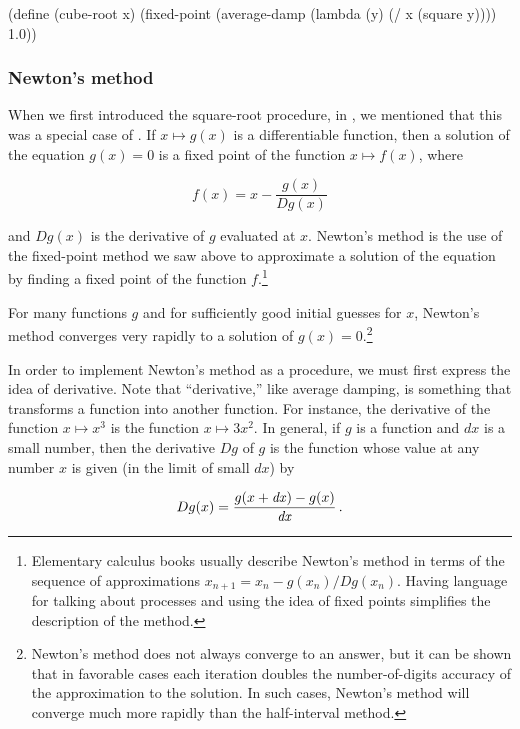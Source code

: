 \begin{codeBlock}
(define (cube-root x)
  (fixed-point (average-damp (lambda (y) (/ x (square y))))
               1.0))
\end{codeBlock}

\subsubsection*{Newton's method}

When we first introduced the square-root procedure, in , we
mentioned that this was a special case of .  If \( x
\mapsto g(x) \) is a differentiable function, then a solution of the equation
\( g(x) = 0 \) is a fixed point of the function \( x \mapsto f(x) \), where

$$ {f(x) = x} - \frac{g(x)}{Dg(x)} $$

\noindent
and \( Dg(x) \) is the derivative of \( g \) evaluated at \( x \).  Newton's
method is the use of the fixed-point method we saw above to approximate a
solution of the equation by finding a fixed point of the function
\( f\!. \)\footnote{Elementary calculus books usually describe Newton's method in
terms of the sequence of approximations \( x_{n+1} = x_n -
g(x_n) / Dg(x_n) \).  Having language for talking about
processes and using the idea of fixed points simplifies the description of the
method.}

For many functions \( g \) and for sufficiently good initial guesses for \( x \),
Newton's method converges very rapidly to a solution of \( g(x) = 0. \)\footnote{Newton's method does not always converge to an answer, but it can
be shown that in favorable cases each iteration doubles the number-of-digits
accuracy of the approximation to the solution.  In such cases, Newton's method
will converge much more rapidly than the half-interval method.}

In order to implement Newton's method as a procedure, we must first express the
idea of derivative.  Note that ``derivative,'' like average damping, is
something that transforms a function into another function.  For instance, the
derivative of the function \( x \mapsto x^3 \) is the function \( x \mapsto 3x^2\!. \)
In general, if \( g \) is a function and \( dx \) is a small number,
then the derivative \( Dg \) of \( g \) is the function whose value at any
number \( x \) is given (in the limit of small \( dx \)) by

$$ {Dg(x)} = \frac{g(x + {\it dx}) - g(x)}{{\it dx}}\,. $$

